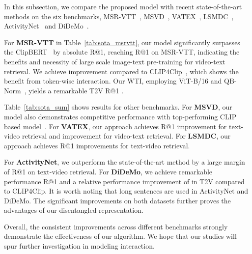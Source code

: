 \documentclass[runningheads]{llncs}
\begin{document}
In this subsection, we compare the proposed model with recent state-of-the-art methods on the six benchmarks, MSR-VTT~\cite{msrvtt}, MSVD~\cite{msvd}, VATEX~\cite{vatex}, LSMDC~\cite{lsmdc}, ActivityNet~\cite{anet} and DiDeMo~\cite{didemo}.

For \textbf{MSR-VTT} in Table~\ref{tab:sota_msrvtt}, our model significantly surpasses the ClipBERT~\cite{clipbert} by absolute  R@1, reaching  R@1 on MSR-VTT, indicating the benefits and necessity of large scale image-text pre-training for video-text retrieval.
We achieve  improvement compared to CLIP4Clip~\cite{clip4clip}, which shows the benefit from token-wise interaction.
Our WTI, employing ViT-B/16 and QB-Norm~\cite{qbnorm}, yields a remarkable T2V R@1 .

Table~\ref{tab:sota_sum} shows results for other benchmarks.
For \textbf{MSVD}, our model also demonstrates competitive performance with top-performing CLIP based model~\cite{clip4clip}. 
For \textbf{VATEX}, our approach achieves  R@1 improvement for text-video retrieval and  improvement for video-text retrieval.
For \textbf{LSMDC}, 
our approach achieves  R@1 improvements for text-video retrieval.

For \textbf{ActivityNet}, we outperform the state-of-the-art method by a large margin of  R@1 on text-video retrieval.   
For \textbf{DiDeMo}, we achieve remarkable performance  R@1 and a relative performance improvement of  in T2V compared to CLIP4Clip.   
It is worth noting that long sentences are used in ActivityNet and DiDeMo. The significant improvements on both datasets further proves the advantages of our disentangled representation.

Overall, the consistent improvements across different benchmarks strongly demonstrate the effectiveness of our algorithm. We hope that our studies will spur further investigation in modeling interaction. 
\end{document}
